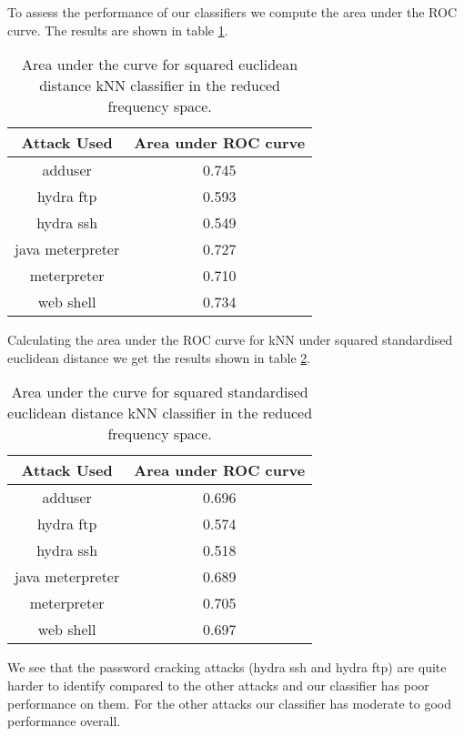 \documentclass[reqno,openany,12pt]{amsbook}
\begin{document}
To assess the performance of our classifiers we compute the area under the ROC curve. The results are shown in table \ref{knnt3}.
\begin{table}
\begin{tabular}{|c|c|}
\hline
Attack Used &  Area under ROC curve \\ \hline 
adduser          & 0.745 \\ \hline
hydra ftp        & 0.593 \\ \hline
hydra ssh        & 0.549 \\ \hline
java meterpreter & 0.727 \\ \hline
meterpreter      & 0.710 \\ \hline
web shell        & 0.734 \\ \hline
\end{tabular}
\vspace{5pt}
\caption[Area under the curve for squared euclidean distance kNN classifier.]{Area under the curve for squared euclidean distance kNN classifier in the reduced frequency space.}
\label{knnt3}
\end{table}
Calculating the area under the ROC curve for kNN under squared standardised euclidean distance we get the results shown in table \ref{knnt4}.

\begin{table}
\begin{tabular}{|c|c|}
\hline
Attack Used &  Area under ROC curve \\ \hline 
adduser          & 0.696 \\ \hline
hydra ftp        & 0.574 \\ \hline
hydra ssh        & 0.518 \\ \hline
java meterpreter & 0.689 \\ \hline
meterpreter      & 0.705 \\ \hline
web shell        & 0.697 \\ \hline
\end{tabular}
\vspace{5pt}
\caption[Area under the curve for squared standardised euclidean distance kNN classifier.]{Area under the curve for squared standardised euclidean distance kNN classifier in the reduced frequency space.}
\label{knnt4}
\end{table}

We see that the password cracking attacks (hydra ssh and hydra ftp) are quite harder to identify compared to the other attacks and our classifier has poor performance on them. For the other attacks our classifier has moderate to good performance overall.
\end{document}
